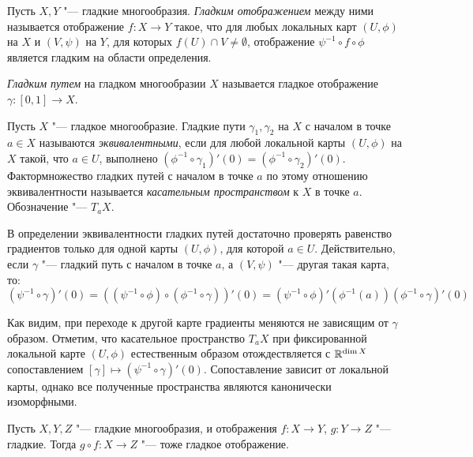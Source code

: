 \begin{definition}
	Пусть $X, Y$ "--- гладкие многообразия. \textit{Гладким отображением} между ними называется отображение $f: X \to Y$ такое, что для любых локальных карт $(U, \phi)$ на $X$ и $(V, \psi)$ на $Y$, для которых $f(U) \cap V \ne \emptyset$, отображение $\psi^{-1} \circ f \circ \phi$ является гладким на области определения.
\end{definition}

\begin{definition}
	\textit{Гладким путем} на гладком многообразии $X$ называется гладкое отображение $\gamma : [0, 1] \to X$.
\end{definition}

\begin{definition}
	Пусть $X$ "--- гладкое многообразие. Гладкие пути $\gamma_1, \gamma_2$ на $X$ с началом в точке $a \in X$ называются \textit{эквивалентными}, если для любой локальной карты $(U, \phi)$ на $X$ такой, что $a \in U$, выполнено $(\phi^{-1} \circ \gamma_1)'(0) = (\phi^{-1} \circ \gamma_2)'(0)$. Фактормножество гладких путей с началом в точке $a$ по этому отношению эквивалентности называется \textit{касательным пространством} к $X$ в точке $a$. Обозначение "--- $T_aX$.
\end{definition}

\begin{note}
	В определении эквивалентности гладких путей достаточно проверять равенство градиентов только для одной карты $(U, \phi)$, для которой $a \in U$. Действительно, если $\gamma$ "--- гладкий путь с началом в точке $a$, а $(V, \psi)$ "--- другая такая карта, то:
	\[(\psi^{-1} \circ \gamma)'(0) = \left((\psi^{-1} \circ \phi) \circ (\phi^{-1} \circ \gamma)\right)'(0) = (\psi^{-1} \circ \phi)'(\phi^{-1}(a))(\phi^{-1} \circ \gamma)'(0)\]
	
	Как видим, при переходе к другой карте градиенты меняются не зависящим от $\gamma$ образом. Отметим, что касательное пространство $T_aX$ при фиксированной локальной карте $(U, \phi)$ естественным образом отождествляется с $\mathbb{R}^{\dim{X}}$ сопоставлением $[\gamma] \mapsto (\psi^{-1} \circ \gamma)'(0)$. Сопоставление зависит от локальной карты, однако все полученные пространства являются канонически изоморфными.
\end{note}

\begin{proposition}
	Пусть $X, Y, Z$ "--- гладкие многообразия, и отображения $f : X \to Y$, $g : Y \to Z$ "--- гладкие. Тогда $g \circ f : X \to Z$ "--- тоже гладкое отображение.
\end{proposition}

